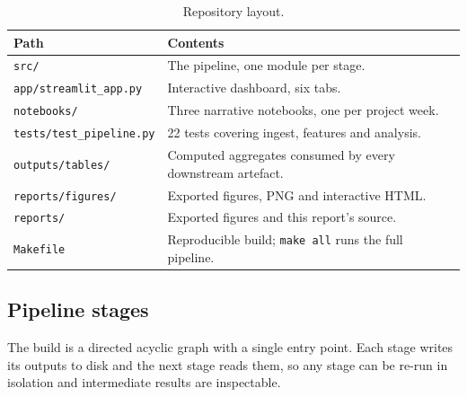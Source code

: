 \documentclass[11pt,a4paper]{article}
\begin{document}
\begin{table}[H]
\centering
\small
\caption{Repository layout.}
\label{tab:repo}
\begin{tabular}{@{}p{4.3cm}p{10.2cm}@{}}
\toprule
\textbf{Path} & \textbf{Contents}\\
\midrule
\texttt{src/} & The pipeline, one module per stage.\\
\texttt{app/streamlit\_app.py} & Interactive dashboard, six tabs.\\
\texttt{notebooks/} & Three narrative notebooks, one per project week.\\
\texttt{tests/test\_pipeline.py} & 22 tests covering ingest, features and analysis.\\
\texttt{outputs/tables/} & Computed aggregates consumed by every downstream artefact.\\
\texttt{reports/figures/} & Exported figures, PNG and interactive HTML.\\
\texttt{reports/} & Exported figures and this report's source.\\
\texttt{Makefile} & Reproducible build; \texttt{make all} runs the full pipeline.\\
\bottomrule
\end{tabular}
\end{table}

\subsection{Pipeline stages}

The build is a directed acyclic graph with a single entry point. Each stage writes
its outputs to disk and the next stage reads them, so any stage can be re-run in
isolation and intermediate results are inspectable.
\end{document}
